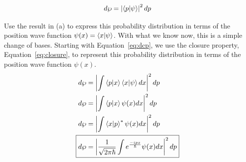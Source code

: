 \documentclass{jhwhw}
\begin{document}
\begin{equation}
	\label{eq:dcp}
	d\wp = \left| \braket{p | \psi} \right|^2 dp
\end{equation}

Use the result in (a) to express this probability distribution in terms of the position wave function $\psi(x) = \braket{x | \psi}$.
\solution
With what we know now, this is a simple change of bases.  Starting with Equation~\eqref{eq:dcp}, we use the closure property, Equation~\eqref{eq:closure}, to represent this probability distribution in terms of the position wave function $\psi(x)$.
\begin{align}
    d\wp &= \left| \int \braket{p|x} \braket{x|\psi} dx \right|^2 dp \\
    d\wp &= \left| \int \braket{p|x} \psi(x) dx \right|^2 dp \\
    d\wp &= \left| \int \braket{x|p}^* \psi(x) dx \right|^2 dp \\
    \Aboxed{d\wp &= \left| \frac{1}{\sqrt{2 \pi \hbar}} \int e^{\frac{-i p x}{\hbar} } \psi(x) dx \right|^2 dp }
\end{align}
\end{document}
